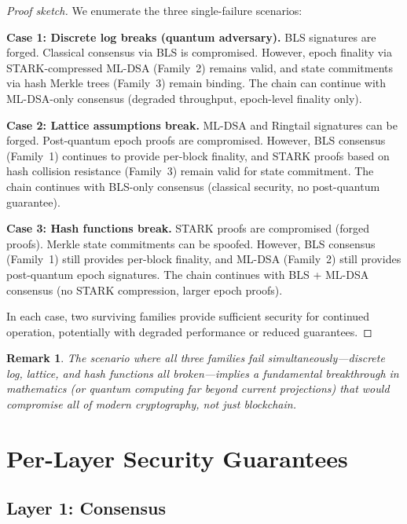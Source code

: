 \documentclass[11pt,a4paper]{article}
\newtheorem{remark}{Remark}[section]
\begin{document}
\begin{proof}[Proof sketch]
We enumerate the three single-failure scenarios:

\textbf{Case 1: Discrete log breaks (quantum adversary).} BLS signatures are forged.
Classical consensus via BLS is compromised. However, epoch finality via
STARK-compressed ML-DSA (Family~2) remains valid, and state commitments via hash
Merkle trees (Family~3) remain binding. The chain can continue with ML-DSA-only
consensus (degraded throughput, epoch-level finality only).

\textbf{Case 2: Lattice assumptions break.} ML-DSA and Ringtail signatures can be
forged. Post-quantum epoch proofs are compromised. However, BLS consensus
(Family~1) continues to provide per-block finality, and STARK proofs based on
hash collision resistance (Family~3) remain valid for state commitment. The chain
continues with BLS-only consensus (classical security, no post-quantum guarantee).

\textbf{Case 3: Hash functions break.} STARK proofs are compromised (forged proofs).
Merkle state commitments can be spoofed. However, BLS consensus (Family~1) still
provides per-block finality, and ML-DSA (Family~2) still provides post-quantum
epoch signatures. The chain continues with BLS + ML-DSA consensus (no STARK
compression, larger epoch proofs).

In each case, two surviving families provide sufficient security for continued
operation, potentially with degraded performance or reduced guarantees.
\end{proof}

\begin{remark}
The scenario where \emph{all three} families fail simultaneously---discrete log,
lattice, and hash functions all broken---implies a fundamental breakthrough in
mathematics (or quantum computing far beyond current projections) that would
compromise all of modern cryptography, not just blockchain.
\end{remark}

\section{Per-Layer Security Guarantees}
\label{sec:layers}

\subsection{Layer 1: Consensus}
\end{document}

